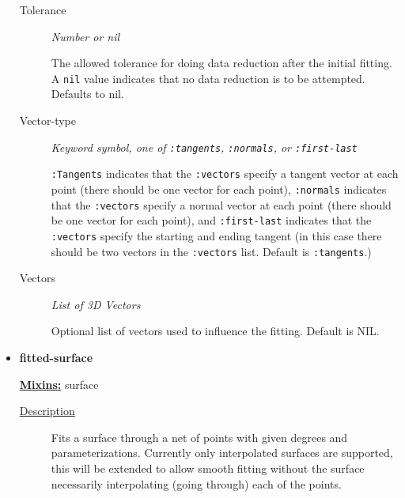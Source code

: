 \documentclass [11pt]{book}
\begin{document}
\begin{itemize}
\begin{description}
\item [Tolerance]
\emph{Number or nil}

 The allowed tolerance for doing data reduction after the initial fitting.
A \texttt{nil} value indicates that no data reduction is to be attempted. Defaults to nil.




\item [Vector-type]
\emph{Keyword symbol, one of \texttt{:tangents}, \texttt{:normals}, or \texttt{:first-last}}

\texttt{:Tangents} indicates that the \texttt{:vectors} specify
a tangent vector at each point (there should be one vector for each point),
\texttt{:normals} indicates that the \texttt{:vectors} specify a normal vector at each
point (there should be one vector for each point), and
\texttt{:first-last} indicates that the \texttt{:vectors} specify the starting and ending
tangent (in this case there should be two vectors in the \texttt{:vectors} list. Default is \texttt{:tangents}.)




\item [Vectors]
\emph{List of 3D Vectors}

 Optional list of vectors used to influence the fitting. Default is NIL.




\end{description}







\item {}
\label{prim:fitted-surface}
\textbf{fitted-surface}


\textbf{
\underline{Mixins:}} surface





\begin{description}

\item [
\underline{Description}]


Fits a surface through a net of points with given degrees and parameterizations. Currently
only interpolated surfaces are supported, this will be extended to allow smooth fitting without the surface necessarily
interpolating (going through) each of the points.




\end{description}
\end{itemize}
\end{document}
